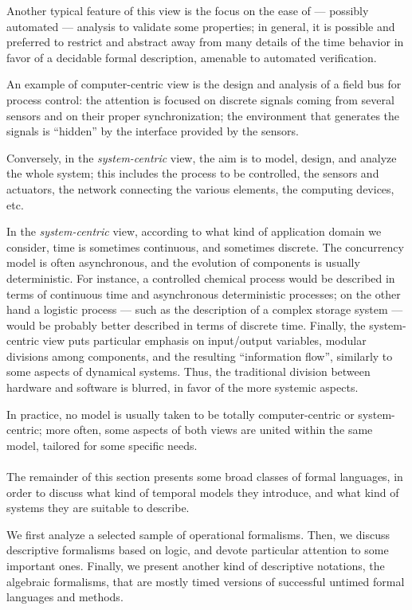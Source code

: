Another typical feature of this view is the focus on the ease 
of --- possibly automated --- analysis to validate some properties; 
in general, it is possible and preferred to restrict and abstract 
away from many details of the time behavior in favor of a decidable 
formal description, amenable to automated verification.

An example of computer-centric view is the design and analysis 
of a field bus for process control: the attention is focused 
on discrete signals coming from several sensors and on their 
proper synchronization; the environment that generates the signals 
is ``hidden'' by the interface provided by the sensors.

Conversely, in the \emph{system-centric} view, the aim is to model, 
design, and analyze the whole system; this includes the process 
to be controlled, the sensors and actuators, the network connecting 
the various elements, the computing devices, etc.

In the \emph{system-centric} view, according to what kind of application 
domain we consider, time is sometimes continuous, and sometimes 
discrete. The concurrency model is often asynchronous, and the 
evolution of components is usually deterministic. For instance, 
a controlled chemical process would be described in terms of 
continuous time and asynchronous deterministic processes; on 
the other hand a logistic process --- such as the description 
of a complex storage system --- would be probably better described 
in terms of discrete time. Finally, the system-centric view puts 
particular emphasis on input/output variables, modular divisions 
among components, and the resulting ``information flow'', similarly 
to some aspects of dynamical systems. Thus, the traditional division 
between hardware and software is blurred, in favor of the more 
systemic aspects.

In practice, no model is usually taken to be totally computer-centric 
or system-centric; more often, some aspects of both views are 
united within the same model, tailored for some specific needs. 


\paragraph{}
The remainder of this section presents some broad classes of 
formal languages, in order to discuss what kind of temporal models 
they introduce, and what kind of systems they are suitable to 
describe.

We first analyze a selected sample of operational formalisms.  Then,
we discuss descriptive formalisms based on logic, and devote
particular attention to some important ones. Finally, we present
another kind of descriptive notations, the algebraic formalisms, that
are mostly timed versions of successful untimed formal languages and
methods.


